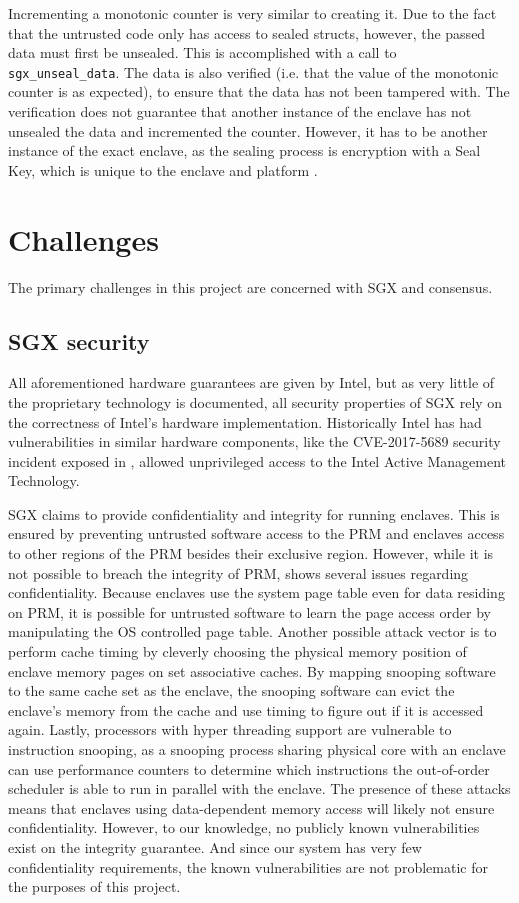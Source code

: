 \documentclass[12pt]{article}
\begin{document}
	Incrementing a monotonic counter is very similar to creating it. 
	Due to the fact that the untrusted code only has access to sealed structs, however, the passed data must first be unsealed. 
	This is accomplished with a call to \texttt{sgx\_unseal\_data}. 
	The data is also verified (i.e. that the value of the monotonic counter is as expected), to ensure that the data has not been tampered with.
	The verification does not guarantee that another instance of the enclave has not unsealed the data and incremented the counter. 
	However, it has to be another instance of the exact enclave, as the sealing process is encryption with a Seal Key, which is unique to the enclave and platform \cite{sgx-dev-guide}.

	\section{Challenges}
	The primary challenges in this project are concerned with SGX and consensus.

		\subsection{SGX security}
	    All aforementioned hardware guarantees are given by Intel, but as very little of the proprietary technology is documented, all security properties of SGX rely on the correctness of Intel's hardware implementation.
	    Historically Intel has had vulnerabilities in similar hardware components, like the CVE-2017-5689 security incident exposed in \cite{silent-bob}, allowed unprivileged access to the Intel Active Management Technology.

	    SGX claims to provide confidentiality and integrity for running enclaves.
	    This is ensured by preventing untrusted software access to the PRM and enclaves access to other regions of the PRM besides their exclusive region.
	    However, while it is not possible to breach the integrity of PRM, \cite{intel-sgx-explained} shows several issues regarding confidentiality.
	    Because enclaves use the system page table even for data residing on PRM, it is possible for untrusted software to learn the page access order by manipulating the OS controlled page table.
	    Another possible attack vector is to perform cache timing by cleverly choosing the physical memory position of enclave memory pages on set associative caches.
	    By mapping snooping software to the same cache set as the enclave, the snooping software can evict the enclave's memory from the cache and use timing to figure out if it is accessed again.
	    Lastly, processors with hyper threading support are vulnerable to instruction snooping, as a snooping process sharing physical core with an enclave can use performance counters to determine which instructions the out-of-order scheduler is able to run in parallel with the enclave.
	    The presence of these attacks means that enclaves using data-dependent memory access will likely not ensure confidentiality.
	    However, to our knowledge, no publicly known vulnerabilities exist on the integrity guarantee. 
	    And since our system has very few confidentiality requirements, the known vulnerabilities are not problematic for the purposes of this project.
\end{document}
